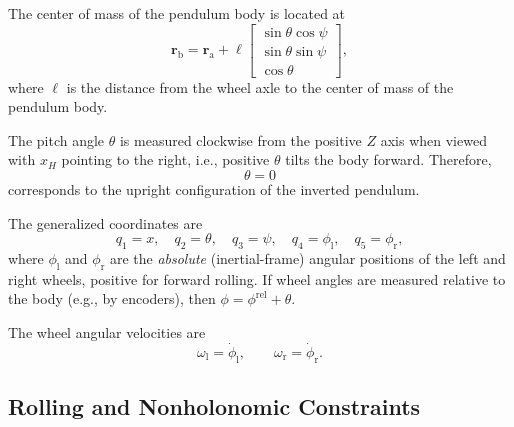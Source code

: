 \documentclass[journal]{IEEEtran}
\begin{document}
The center of mass of the pendulum body is located at
\begin{equation}
    \bm{r}_{\mathrm{b}}
    =
    \bm{r}_{\mathrm{a}}
    +
    \ell
    \begin{bmatrix}
        \sin\theta\cos\psi \\
        \sin\theta\sin\psi \\
        \cos\theta
    \end{bmatrix},
    \label{eq:body_position}
\end{equation}
where $\ell$ is the distance from the wheel axle to the center of mass
of the pendulum body.

The pitch angle $\theta$ is measured clockwise from the positive $Z$ axis
when viewed with $x_H$ pointing to the right, i.e., positive $\theta$ tilts
the body forward. Therefore,
\begin{equation}
    \theta = 0
\end{equation}
corresponds to the upright configuration of the inverted pendulum.

The generalized coordinates are
\begin{equation}
    q_1 = x,
    \quad
    q_2 = \theta,
    \quad
    q_3 = \psi,
    \quad
    q_4 = \phi_{\mathrm l},
    \quad
    q_5 = \phi_{\mathrm r},
    \label{eq:generalized_coordinates}
\end{equation}
where $\phi_{\mathrm l}$ and $\phi_{\mathrm r}$ are the \emph{absolute}
(inertial-frame) angular positions of the left and right wheels, positive
for forward rolling. If wheel angles are measured relative to the body
(e.g., by encoders), then $\phi=\phi^{\mathrm{rel}}+\theta$.

The wheel angular velocities are
\begin{equation}
    \omega_{\mathrm l}
    =
    \dot{\phi}_{\mathrm l},
    \qquad
    \omega_{\mathrm r}
    =
    \dot{\phi}_{\mathrm r}.
    \label{eq:wheel_angular_velocity}
\end{equation}

\subsection{Rolling and Nonholonomic Constraints}
\end{document}
